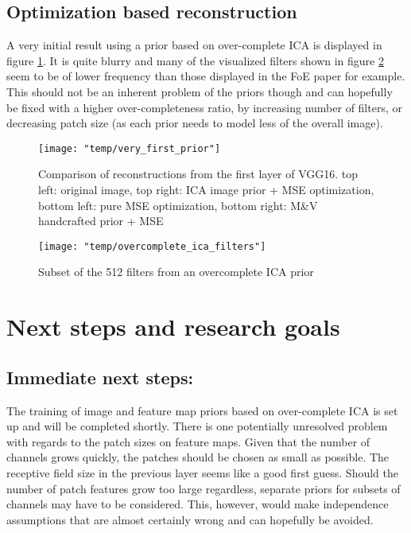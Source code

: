 \documentclass{article}
\begin{document}
\subsection{Optimization based reconstruction}

A very initial result using a prior based on over-complete ICA is displayed in figure \ref{fig:first_ica}. It is quite blurry and many of the visualized filters shown in figure \ref{fig:first_ica_filters} seem to be of lower frequency than those displayed in the FoE paper for example. This should not be an inherent problem of the priors though and can hopefully be fixed with a higher over-completeness ratio, by increasing number of filters, or decreasing patch size (as each prior needs to model less of the overall image). 

\begin{figure}
	\centering
	\texttt{[image: "temp/very\_first\_prior"]}
	\caption{Comparison of reconstructions from the first layer of VGG16.
		top left: original image, top right: ICA image prior + MSE optimization, bottom left: pure MSE optimization, bottom right: M\&V handcrafted prior + MSE}
	\label{fig:first_ica}
\end{figure}


\begin{figure}
	\centering
	\texttt{[image: "temp/overcomplete\_ica\_filters"]}
	\caption{Subset of the 512 filters from an overcomplete ICA prior}
	\label{fig:first_ica_filters}
\end{figure}

\FloatBarrier
\section{Next steps and research goals}

\subsection{Immediate next steps:}

The training of image and feature map priors based on over-complete ICA is set up and will be completed shortly. There is one potentially unresolved problem with regards to the patch sizes on feature maps. Given that the number of channels grows quickly, the patches should be chosen as small as possible. The receptive field size in the previous layer seems like a good first guess. Should the number of patch features grow too large regardless, separate priors for subsets of channels may have to be considered. This, however, would make independence assumptions that are almost certainly wrong and can hopefully be avoided. 
\end{document}
